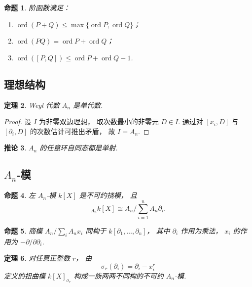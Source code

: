 \documentclass[11pt]{article}
\theoremstyle{plain}
\newtheorem{theorem}{定理}[section]
\newtheorem{proposition}[theorem]{命题}
\newtheorem{corollary}[theorem]{推论}
\theoremstyle{definition}
\theoremstyle{remark}
\newcommand{\ord}{\operatorname{ord}}
\begin{document}
\begin{proposition}
    阶函数满足：
    \begin{enumerate}
        \item
              $\ord(P+Q)\le\max\{\ord P,\ord Q\}$；
        \item
              $\ord(PQ)=\ord P+\ord Q$；
        \item
              $\ord([P,Q])\le\ord P+\ord Q-1$.
    \end{enumerate}
\end{proposition}

\subsection{理想结构}

\begin{theorem}
    Weyl 代数 $A_n$ 是单代数.
\end{theorem}

\begin{proof}
    设 $I$ 为非零双边理想，
    取次数最小的非零元 $D\in I$.
    通过对 $[x_i,D]$ 与 $[\partial_i,D]$
    的次数估计可推出矛盾，
    故 $I=A_n$.
\end{proof}

\begin{corollary}
    $A_n$ 的任意环自同态都是单射.
\end{corollary}

\subsection{$A_n$-模}

\begin{proposition}
    左 $A_n$-模 $k[X]$ 是不可约挠模，
    且
    \[
        {}_{A_n}k[X]\cong
        A_n/\sum_{i=1}^n A_n\partial_i.
    \]
\end{proposition}

\begin{proposition}
    商模
    $A_n/\sum_i A_n x_i$
    同构于 $k[\partial_1,\dots,\partial_n]$，
    其中 $\partial_i$ 作用为乘法，
    $x_i$ 的作用为 $-\partial/\partial\partial_i$.
\end{proposition}

\begin{theorem}
    对任意正整数 $r$，
    由
    \[
        \sigma_r(\partial_i)=\partial_i-x_i^r
    \]
    定义的扭曲模 $k[X]_{\sigma_r}$
    构成一族两两不同构的不可约 $A_n$-模.
\end{theorem}
\end{document}
